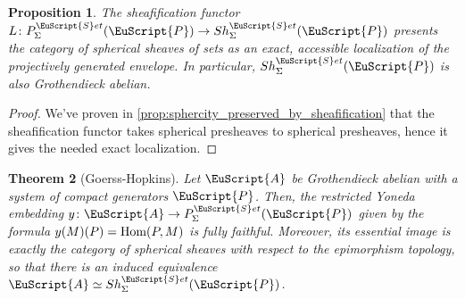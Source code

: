 \documentclass[oneside,a4paper]{amsart}
\newcommand{\euscr}[1]{\EuScript{#1}} %
\newcommand{\acat}{\euscr{A}} %
\newcommand{\pcat}{\euscr{P}} %
\newcommand{\Hom}{\textnormal{Hom}} %
\newcommand{\sets}{\euscr{S}et} %
\theoremstyle{plain}
\newtheorem{thm}{Theorem}[section]
\newtheorem{prop}[thm]{Proposition}
\theoremstyle{definition}
\theoremstyle{remark}
\begin{document}
\begin{prop}
\label{prop:sheaves_as_an_exact_localization}
The sheafification functor $L \colon P_{\Sigma}^{\sets}(\pcat) \rightarrow Sh_{\Sigma}^{\sets}(\pcat)$ presents the category of spherical sheaves of sets as an exact, accessible localization of the projectively generated envelope. In particular, $Sh_{\Sigma}^{\sets}(\pcat)$ is also Grothendieck abelian.
\end{prop}

\begin{proof}
We've proven in \cref{prop:sphercity_preserved_by_sheafification} that the sheafification functor takes spherical presheaves to spherical presheaves, hence it gives the needed exact localization.
\end{proof}

\begin{thm}[Goerss-Hopkins]
\label{thm:compactly_generated_grothendieck_category_as_spherical_sheaves}
Let $\acat$ be Grothendieck abelian with a system of compact generators $\pcat$. Then, the restricted Yoneda embedding $y \colon \acat \rightarrow P_{\Sigma}^{\sets}(\pcat)$ given by the formula $y(M)(P) = \Hom(P, M)$ is fully faithful. Moreover, its essential image is exactly the category of spherical sheaves with respect to the epimorphism topology, so that there is an induced equivalence $\acat \simeq Sh_{\Sigma}^{\sets}(\pcat)$. 
\end{thm}
\end{document}
